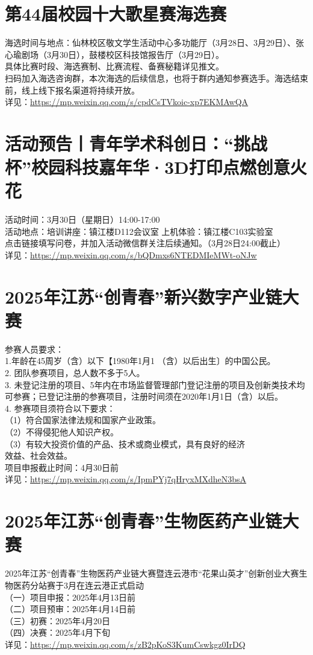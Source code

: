 \documentclass[letterpaper, 12pt]{article}
\begin{document}
\begin{multicols}{2}
\section{第44届校园十大歌星赛海选赛}
海选时间与地点：仙林校区敬文学生活动中心多功能厅（3月28日、3月29日）、张心瑜剧场（3月30日），鼓楼校区科技馆报告厅（3月29日）。
\\具体比赛时段、海选赛制、比赛流程、备赛秘籍详见推文。
\\扫码加入海选咨询群，本次海选的后续信息，也将于群内通知参赛选手。海选结束前，线上线下报名渠道将持续开放。
\\详见：\url{https://mp.weixin.qq.com/s/cpdCsTVkoic-xp7EKMAwQA}

\section{活动预告丨青年学术科创日：“挑战杯”校园科技嘉年华·3D打印点燃创意火花}
活动时间：3月30日（星期日）14:00-17:00
\\活动地点：培训讲座：镇江楼D112会议室 上机体验：镇江楼C103实验室
\\点击链接填写问卷，并加入活动微信群关注后续通知。（3月28日24:00截止）
\\详见：\url{https://mp.weixin.qq.com/s/bQDmxs6NTEDMIeMWt-oNJw}

\section{2025年江苏“创青春”新兴数字产业链大赛}
参赛人员要求：
\\1.年龄在45周岁（含）以下【1980年1月1 （含）以后出生〕的中国公民。
\\2. 团队参赛项目，总人数不多于5人。
\\3. 未登记注册的项目、5年内在市场监督管理部门登记注册的项目及创新类技术均可参赛；已登记注册的参赛项目，注册时间须在2020年1月1日（含）以后。
\\4. 参赛项目须符合以下要求：
\\（1）符合国家法律法规和国家产业政策。
\\（2）不得侵犯他人知识产权。
\\（3）有较大投资价值的产品、技术或商业模式，具有良好的经济
\\效益、社会效益。
\\项目申报截止时间：4月30日前
\\详见：\url{https://mp.weixin.qq.com/s/IpmPYj7qHryxMXdheN3bsA}

\section{2025年江苏“创青春”生物医药产业链大赛}
2025年江苏“创青春”生物医药产业链大赛暨连云港市“花果山英才”创新创业大赛生物医药分站赛于3月在连云港正式启动
\\（一）项目申报：2025年4月13日前
\\（二）项目预审：2025年4月14日前
\\（三）初赛：2025年4月20日
\\（四）决赛：2025年4月下旬
\\详见：\url{https://mp.weixin.qq.com/s/zB2pKoS3KumCswkgz0IrDQ}



\end{multicols}
\end{document}
